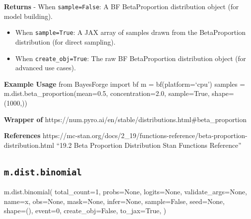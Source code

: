 \documentclass[
  letterpaper,
  DIV=11,
  numbers=noendperiod]{scrartcl}
\newenvironment{Shaded}{\begin{snugshade}}{\end{snugshade}}
\newcommand{\DecValTok}[1]{\textcolor[rgb]{0.68,0.00,0.00}{#1}}
\newcommand{\NormalTok}[1]{\textcolor[rgb]{0.00,0.23,0.31}{#1}}
\newcommand{\OperatorTok}[1]{\textcolor[rgb]{0.37,0.37,0.37}{#1}}
\newcommand{\StringTok}[1]{\textcolor[rgb]{0.13,0.47,0.30}{#1}}
\newcommand{\VariableTok}[1]{\textcolor[rgb]{0.07,0.07,0.07}{#1}}
\begin{document}
\textbf{Returns} - When \texttt{sample=False}: A BF BetaProportion
distribution object (for model building).

\begin{itemize}
\item
  When \texttt{sample=True}: A JAX array of samples drawn from the
  BetaProportion distribution (for direct sampling).
\item
  When \texttt{create\_obj=True}: The raw BF BetaProportion distribution
  object (for advanced use cases).
\end{itemize}

\textbf{Example Usage} from BayesForge import bf m = bf(platform=`cpu')
samples = m.dist.beta\_proportion(mean=0.5, concentration=2.0,
sample=True, shape=(1000,))

\textbf{Wrapper of}
https://num.pyro.ai/en/stable/distributions.html\#beta\_proportion

\textbf{References}
https://mc-stan.org/docs/2\_19/functions-reference/beta-proportion-distribution.html
``19.2 Beta Proportion Distribution \textbar{} Stan Functions
Reference''

\subsection{\texorpdfstring{\texttt{m.dist.binomial}}{m.dist.binomial}}\label{binomial}

\begin{Shaded}
\begin{Highlighting}[]
\NormalTok{m.dist.binomial(}
\NormalTok{    total\_count}\OperatorTok{=}\DecValTok{1}\NormalTok{,}
\NormalTok{    probs}\OperatorTok{=}\VariableTok{None}\NormalTok{,}
\NormalTok{    logits}\OperatorTok{=}\VariableTok{None}\NormalTok{,}
\NormalTok{    validate\_args}\OperatorTok{=}\VariableTok{None}\NormalTok{,}
\NormalTok{    name}\OperatorTok{=}\StringTok{\textquotesingle{}x\textquotesingle{}}\NormalTok{,}
\NormalTok{    obs}\OperatorTok{=}\VariableTok{None}\NormalTok{,}
\NormalTok{    mask}\OperatorTok{=}\VariableTok{None}\NormalTok{,}
\NormalTok{    infer}\OperatorTok{=}\VariableTok{None}\NormalTok{,}
\NormalTok{    sample}\OperatorTok{=}\VariableTok{False}\NormalTok{,}
\NormalTok{    seed}\OperatorTok{=}\VariableTok{None}\NormalTok{,}
\NormalTok{    shape}\OperatorTok{=}\NormalTok{(),}
\NormalTok{    event}\OperatorTok{=}\DecValTok{0}\NormalTok{,}
\NormalTok{    create\_obj}\OperatorTok{=}\VariableTok{False}\NormalTok{,}
\NormalTok{    to\_jax}\OperatorTok{=}\VariableTok{True}\NormalTok{,}
\NormalTok{)}
\end{Highlighting}
\end{Shaded}
\end{document}
